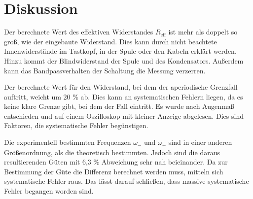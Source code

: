 


\section{Diskussion}
\label{sec:Diskussion}

Der berechnete Wert des effektiven Widerstandes $R_\text{eff}$ ist mehr als doppelt so groß, wie der eingebaute Widerstand. 
Dies kann durch nicht beachtete Innenwiderstände im Tastkopf, in der Spule oder den Kabeln erklärt werden. 
Hinzu kommt der Blindwiderstand der Spule und des Kondensators. Außerdem kann das Bandpassverhalten der Schaltung die Messung verzerren.

\noindent Der berechnete Wert für den Widerstand, bei dem der aperiodische Grenzfall auftritt, weicht um 20 \% ab. Dies kann an systematischen 
Fehlern liegen, da es keine klare Grenze gibt, bei dem der Fall eintritt. Es wurde nach Augenmaß entschieden und auf einem Oszilloskop mit kleiner Anzeige 
abgelesen. Dies sind Faktoren, die systematische Fehler begünstigen.

\noindent Die experimentell bestimmten Frequenzen $\omega_-$ und $\omega_+$ sind in einer anderen Größenordnung, als die theoretisch bestimmten. 
Jedoch sind die daraus resultierenden Güten mit 6,3 \% Abweichung sehr nah beieinander. Da zur Bestimmung der Güte die Differenz berechnet werden muss, 
mitteln sich systematische Fehler raus. Das lässt darauf schließen, dass massive systematische Fehler begangen worden sind.  
 



